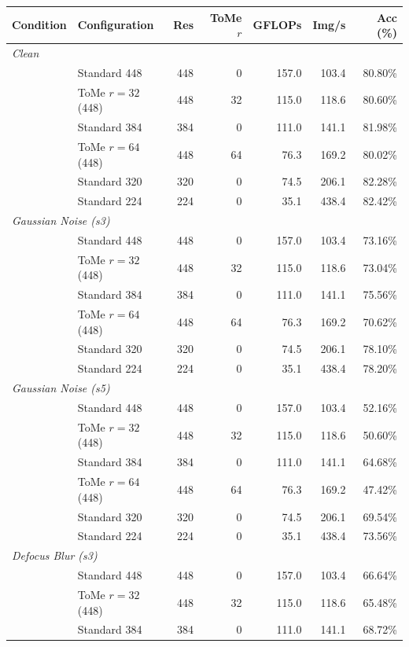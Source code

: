 \begin{table}[t]
\centering
\small
\begin{tabular}{llrrrrr}
\toprule
Condition & Configuration & Res & ToMe $r$ & GFLOPs & Img/s & Acc (\%) \\
\midrule
\multicolumn{7}{l}{\textit{Clean}} \\
 & Standard 448 & 448 & 0 & 157.0 & 103.4 & 80.80\% \\
 & ToMe $r=32$ (448) & 448 & 32 & 115.0 & 118.6 & 80.60\% \\
 & Standard 384 & 384 & 0 & 111.0 & 141.1 & 81.98\% \\
 & ToMe $r=64$ (448) & 448 & 64 & 76.3 & 169.2 & 80.02\% \\
 & Standard 320 & 320 & 0 & 74.5 & 206.1 & 82.28\% \\
 & Standard 224 & 224 & 0 & 35.1 & 438.4 & 82.42\% \\
\midrule
\multicolumn{7}{l}{\textit{Gaussian Noise (s3)}} \\
 & Standard 448 & 448 & 0 & 157.0 & 103.4 & 73.16\% \\
 & ToMe $r=32$ (448) & 448 & 32 & 115.0 & 118.6 & 73.04\% \\
 & Standard 384 & 384 & 0 & 111.0 & 141.1 & 75.56\% \\
 & ToMe $r=64$ (448) & 448 & 64 & 76.3 & 169.2 & 70.62\% \\
 & Standard 320 & 320 & 0 & 74.5 & 206.1 & 78.10\% \\
 & Standard 224 & 224 & 0 & 35.1 & 438.4 & 78.20\% \\
\midrule
\multicolumn{7}{l}{\textit{Gaussian Noise (s5)}} \\
 & Standard 448 & 448 & 0 & 157.0 & 103.4 & 52.16\% \\
 & ToMe $r=32$ (448) & 448 & 32 & 115.0 & 118.6 & 50.60\% \\
 & Standard 384 & 384 & 0 & 111.0 & 141.1 & 64.68\% \\
 & ToMe $r=64$ (448) & 448 & 64 & 76.3 & 169.2 & 47.42\% \\
 & Standard 320 & 320 & 0 & 74.5 & 206.1 & 69.54\% \\
 & Standard 224 & 224 & 0 & 35.1 & 438.4 & 73.56\% \\
\midrule
\multicolumn{7}{l}{\textit{Defocus Blur (s3)}} \\
 & Standard 448 & 448 & 0 & 157.0 & 103.4 & 66.64\% \\
 & ToMe $r=32$ (448) & 448 & 32 & 115.0 & 118.6 & 65.48\% \\
 & Standard 384 & 384 & 0 & 111.0 & 141.1 & 68.72\% \\

\end{tabular}
\end{table}
